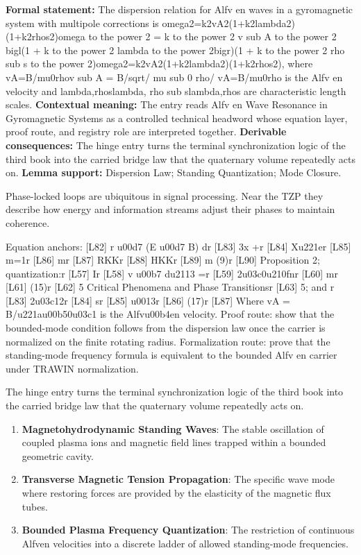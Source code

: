 \begingroup\footnotesize\setlength{\emergencystretch}{3em}\sloppy
\textbf{Formal statement:} The dispersion relation for Alfv en waves in a gyromagnetic system with multipole corrections is omega2=k2vA2(1+k2lambda2)(1+k2rhos2)omega to the power 2 = k to the power 2 v sub A to the power 2 bigl(1 + k to the power 2 lambda to the power 2bigr)(1 + k to the power 2 rho sub s to the power 2)omega2=k2vA2(1+k2lambda2)(1+k2rhos2), where vA=B/mu0rhov sub A = B/sqrt/ mu sub 0 rho/ vA=B/mu0rho is the Alfv en velocity and lambda,rhoslambda, rho sub slambda,rhos are characteristic length scales. \textbf{Contextual meaning:} The entry reads Alfv en Wave Resonance in Gyromagnetic Systems as a controlled technical headword whose equation layer, proof route, and registry role are interpreted together. \textbf{Derivable consequences:} The hinge entry turns the terminal synchronization logic of the third book into the carried bridge law that the quaternary volume repeatedly acts on. \textbf{Lemma support:} Dispersion Law; Standing Quantization; Mode Closure.\par
\endgroup

Phase-locked loops are ubiquitous in signal processing. Near the TZP they describe how energy and information streams adjust their phases to maintain coherence.

Equation anchors: [L82] r u00d7 (E u00d7 B) dr [L83] 3x +r [L84] Xu221er [L85] m=1r [L86] mr [L87] RKKr [L88] HKKr [L89] m (9)r [L90] Proposition 2; quantization:r [L57] Ir [L58] v u00b7 du2113 =r [L59] 2u03c0u210fnr [L60] mr [L61] (15)r [L62] 5 Critical Phenomena and Phase Transitionsr [L63] 5; and r [L83] 2u03c12r [L84] sr [L85] u0013r [L86] (17)r [L87] Where vA = B/u221au00b50u03c1 is the Alfvu00b4en velocity. Proof route: show that the bounded-mode condition follows from the dispersion law once the carrier is normalized on the finite rotating radius. Formalization route: prove that the standing-mode frequency formula is equivalent to the bounded Alfv en carrier under TRAWIN normalization.

The hinge entry turns the terminal synchronization logic of the third book into the carried bridge law that the quaternary volume repeatedly acts on.
\endgroup

\begin{enumerate}[leftmargin=1.6em,itemsep=6pt,topsep=4pt]
\item \textbf{Magnetohydrodynamic Standing Waves}: The stable oscillation of coupled plasma ions and magnetic field lines trapped within a bounded geometric cavity.
\item \textbf{Transverse Magnetic Tension Propagation}: The specific wave mode where restoring forces are provided by the elasticity of the magnetic flux tubes.
\item \textbf{Bounded Plasma Frequency Quantization}: The restriction of continuous Alfven velocities into a discrete ladder of allowed standing-mode frequencies.
\end{enumerate}

